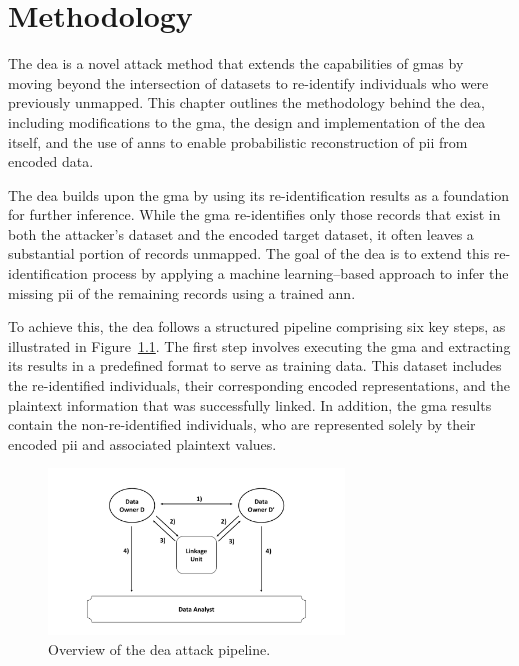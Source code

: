 \chapter{Methodology}  \label{sec:method}

The \ac{dea} is a novel attack method that extends the capabilities of \ac{gma}s by moving beyond the intersection of datasets to re-identify individuals who were previously unmapped.
This chapter outlines the methodology behind the \ac{dea}, including modifications to the \ac{gma}, the design and implementation of the \ac{dea} itself, and the use of \ac{ann}s to enable probabilistic reconstruction of \ac{pii} from encoded data.

The \ac{dea} builds upon the \ac{gma} by using its re-identification results as a foundation for further inference.
While the \ac{gma} re-identifies only those records that exist in both the attacker’s dataset and the encoded target dataset, it often leaves a substantial portion of records unmapped.
The goal of the \ac{dea} is to extend this re-identification process by applying a machine learning–based approach to infer the missing \ac{pii} of the remaining records using a trained \ac{ann}.

To achieve this, the \ac{dea} follows a structured pipeline comprising six key steps, as illustrated in Figure~\ref{fig:deaoverview}.
The first step involves executing the \ac{gma} and extracting its results in a predefined format to serve as training data.
This dataset includes the re-identified individuals, their corresponding encoded representations, and the plaintext information that was successfully linked.
In addition, the \ac{gma} results contain the non-re-identified individuals, who are represented solely by their encoded \ac{pii} and associated plaintext values.

\begin{figure}[H]
    \centering
    \includegraphics[width=0.7\textwidth, page=15]{img/visualization.pdf}
    \caption{Overview of the \ac{dea} attack pipeline.}
    \label{fig:deaoverview}
\end{figure}


